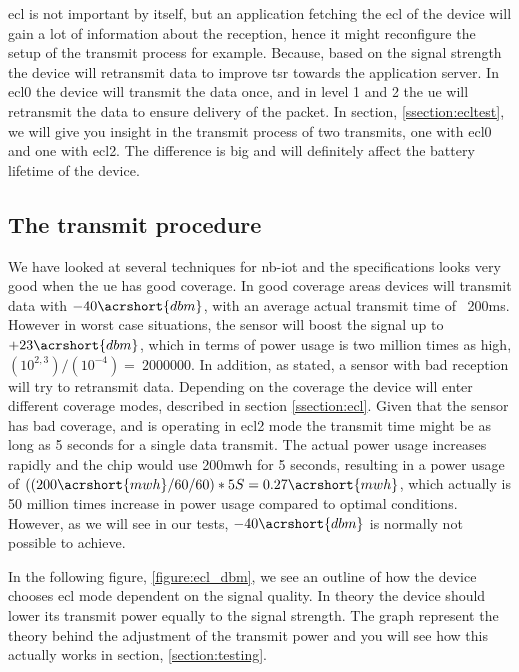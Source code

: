 \documentclass[USenglish]{ifimaster}  %
\begin{document}
\acrshort{ecl} is not important by itself, but an application fetching the \acrshort{ecl} of the device will gain a lot of information about the reception, hence it might reconfigure the setup of the transmit process for example. Because, based on the signal strength the device will retransmit data to improve \acrfull{tsr} towards the application server. In \acrshort{ecl}0 the device will transmit the data once, and in level 1 and 2 the \acrshort{ue} will retransmit the data to ensure delivery of the packet. In section, \vref{ssection:ecltest}, we will give you insight in the transmit process of two transmits, one with \acrshort{ecl}0 and one with \acrshort{ecl}2. The difference is big and will definitely affect the battery lifetime of the device.

\subsection{The transmit procedure} \label{ssection:transmitprocedure}
We have looked at several techniques for \acrshort{nb-iot} and the specifications looks very good when the \acrshort{ue} has good coverage. In good coverage areas devices will transmit data with ${-40 \acrshort{dbm}}$, with an average actual transmit time of ~200ms. However in worst case situations, the sensor will boost the signal up to ${+23 \acrshort{dbm}}$, which in terms of power usage is two million times as high, ${(10^{2,3}) / (10^{-4}) = ~2 000 000}$. In addition, as stated, a sensor with bad reception will try to retransmit data. Depending on the coverage the device will enter different coverage modes, described in section \vref{ssection:ecl}. Given that the sensor has bad coverage, and is operating in \acrshort{ecl}2 mode the transmit time might be as long as 5 seconds for a single data transmit. The actual power usage increases rapidly and the chip would use 200\acrshort{mwh} for 5 seconds, resulting in a power usage of ${((200 \acrshort{mwh} / 60 / 60) * 5S = 0.27 \acrshort{mwh}}$, which actually is 50 million times increase in power usage compared to optimal conditions. However, as we will see in our tests, ${-40 \acrshort{dbm}}$ is normally not possible to achieve.

In the following figure, \vref{figure:ecl_dbm}, we see an outline of how the device chooses \acrshort{ecl} mode dependent on the signal quality. In theory the device should lower its transmit power equally to the signal strength. The graph represent the theory behind the adjustment of the transmit power and you will see how this actually works in section, \vref{section:testing}.
\end{document}
